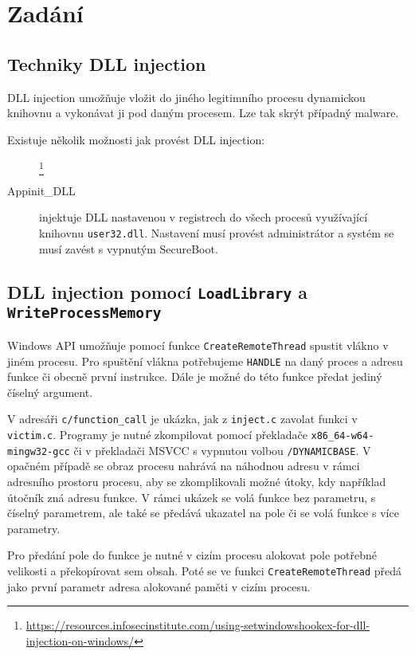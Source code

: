 \documentclass[12pt,a4paper]{article}
\begin{document}


\section{Zadání}
\subsection{Techniky DLL injection}
DLL injection umožňuje vložit do jiného legitimního procesu dynamickou knihovnu a vykonávat ji pod daným procesem.
Lze tak skrýt případný malware.

Existuje několik možnosti jak provést DLL injection:



\begin{description}
\item[] 
\footnote{\url{https://resources.infosecinstitute.com/using-setwindowshookex-for-dll-injection-on-windows/}}	
	
	
	
\item[Appinit\_DLL] injektuje DLL nastavenou v registrech do všech procesů využívající knihovnu \texttt{user32.dll}. 
Nastavení musí provést administrátor a systém se musí zavést s vypnutým SecureBoot.
\end{description}

\subsection{DLL injection pomocí \texttt{LoadLibrary} a \texttt{WriteProcessMemory}}
Windows API umožňuje pomocí funkce \texttt{CreateRemoteThread} spustit vlákno v jiném procesu.
Pro spuštění vlákna potřebujeme \texttt{HANDLE} na daný proces a adresu funkce či obecně první instrukce.
Dále je možné do této funkce předat jediný číselný argument.

V adresáři \texttt{c/function\_call} je ukázka, jak z \texttt{inject.c} zavolat funkci v \texttt{victim.c}.
Programy je nutné zkompilovat pomocí překladače \texttt{x86\_64-w64-mingw32-gcc} či v překladači MSVCC s vypnutou volbou \texttt{/DYNAMICBASE}.
V opačném případě se obraz procesu nahrává na náhodnou adresu v rámci adresního prostoru procesu, aby se zkomplikovali možné útoky, kdy například útočník zná adresu funkce.
V rámci ukázek se volá funkce bez parametru, s číselný parametrem, ale také se předává ukazatel na pole či se volá funkce s více parametry.

Pro předání pole do funkce je nutné v cizím procesu alokovat pole potřebné velikosti a překopírovat sem obsah.
Poté se ve funkci \texttt{CreateRemoteThread} předá jako první parametr adresa alokované paměti v cizím procesu.
\end{document}
